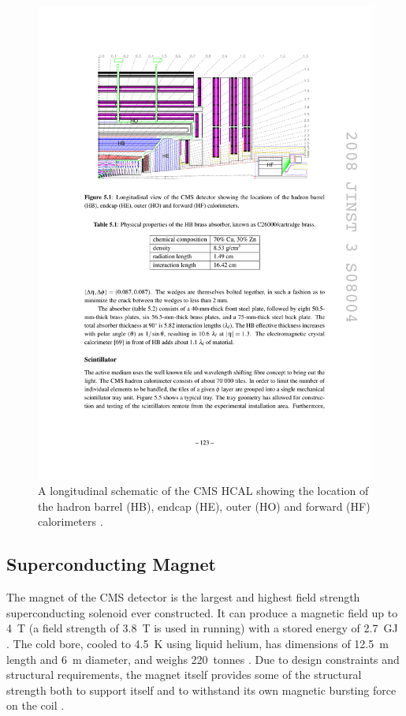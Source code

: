 \begin{figure}[hbtp]
   \centering
     \includegraphics[width=\textwidth]{Chapters/02_Detector/Images/HCAL.pdf}\hfill
     \caption[A longitudinal schematic of the CMS HCAL.]{A longitudinal schematic of the CMS HCAL showing the
     location of the hadron barrel (HB), endcap (HE), outer (HO) and forward (HF) calorimeters
     \cite{CMS_experiment}.}
     \label{fig:CMS_HCAL}
\end{figure} 

\subsection{Superconducting Magnet}
\label{ss:Magnet}
The magnet of the CMS detector is the largest and highest field strength superconducting solenoid ever
constructed. It can produce a magnetic field up to 4~T (a field strength of 3.8~T is used in running) with a
stored energy of 2.7~GJ \cite{CMS_TDR1}. The cold bore, cooled to 4.5~K using liquid helium, has dimensions of
12.5~m length and 6~m diameter, and weighs 220~tonnes \cite{Cryogenic_System_for_Superconducting_Solenoid}.
Due to design constraints and structural requirements, the magnet itself provides some of the structural strength both to support itself and to
withstand its own magnetic bursting force on the coil \cite{CMS_experiment}.

